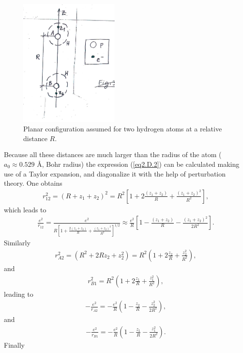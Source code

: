 \begin{subappendices}
    \begin{figure}[h!]
     \centerline{\includegraphics*[width=5cm,angle=0]{nutshell/figs/fig2D4.pdf}}
     \caption{Planar configuration assumed for two hydrogen atoms at a relative distance $R$.}\label{fig2.D.4}
     \end{figure}
Because all these distances are much larger than the radius of the atom ($a_0\approx0.529$ \AA, Bohr radius) the expression (\ref{eq2.D.2}) can be calculated making use of a Taylor expansion, and diagonalize it with the help of perturbation theory. One obtains
\begin{align}\label{eq2.D.4}
r_{12}^2=(R+z_1+z_2)^2=R^2\left[1+2\frac{(z_1+z_2)}{R}+\frac{(z_1+z_2)^2}{R^2}\right],
\end{align}
which leads to 
\begin{align}\label{eq2.D.5}
\frac{e^2}{r_{12}}=\frac{e^2}{R\left[1+\frac{2(z_1+z_2)}{R}+\frac{(z_1+z_2)^2}{R^2}\right]^{1/2}}\approx\frac{e^2}{R}\left[1-\frac{(z_1+z_2)}{R}-\frac{(z_1+z_2)^2}{2R^2}\right].
\end{align}
 Similarly
\begin{align}\label{eq2.D.6}
r^2_{A2}=\left(R^2+2Rz_2+z_2^2\right)=R^2\left(1+2\frac{z_2}{R}+\frac{z_2^2}{R^2}\right),
\end{align}
and
\begin{align}\label{eq2.D.7}
r^2_{B1}=R^2\left(1+2\frac{z_1}{R}+\frac{z_1^2}{R^2}\right),
\end{align}
leading to
\begin{align}\label{eq2.D.8}
-\frac{e^2}{r_{A2}}=-\frac{e^2}{R}\left(1-\frac{z_2}{R}-\frac{z_2^2}{2R^2}\right),
\end{align}
and
\begin{align}\label{eq2.D.9}
-\frac{e^2}{r_{B1}}=-\frac{e^2}{R}\left(1-\frac{z_1}{R}-\frac{z_1^2}{2R^2}\right).
\end{align}
Finally
\begin{align}\label{eq2.D.10}

\end{align}
\end{subappendices}
